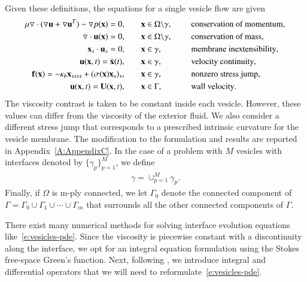 Given these definitions, the equations for a single vesicle flow are
given
\begin{equation}
\label{e:vesicles-pde}
\begin{split}
\mu \grad \cdot (\grad \uu + \grad \uu^{T}) - 
\grad p(\xx) = 0, &\hspace{20pt} \xx \in \Omega\backslash\gamma, \gap
&&\mbox{conservation of momentum},\\
%
 \grad \cdot \uu(\xx) = 0,  &\hspace{20pt} \xx \in \Omega \backslash
 \gamma, \gap &&\mbox{conservation of mass}, \\
%
  \xx_{s} \cdot \uu_{s} = 0, &\hspace{20pt} \xx \in \gamma, \gap
  &&\mbox{membrane inextensibility},\\
%
   \uu(\xx,t) = \dot{\xx}(t), &\hspace{20pt} \xx \in \gamma, \gap   &&\mbox{velocity continuity},\\
\ff(\xx)= -\kappa_{b}\xx_{ssss}
 + (\sigma(\xx) \xx_{s})_{s}, &\hspace{20pt} \xx \in \gamma, \gap  &&\mbox{nonzero stress jump},\\
%
 \uu(\xx,t) = \mathbf{U}(\xx,t), &\hspace{20pt} \xx \in \Gamma, \gap  &&\mbox{wall velocity}. \\
\end{split}
\end{equation}
The viscosity contrast is taken to be constant inside each vesicle.
However, these values can differ from the viscosity of the exterior
fluid.  We also consider a different stress jump that corresponds to a
prescribed intrinsic curvature for the vesicle membrane.  The
modification to the formulation and results are reported in
Appendix~\ref{A:AppendixC}.  In the case of a problem with $M$ vesicles
with interfaces denoted by $\{\gamma_p\}_{p=1}^M$, we define
\begin{align*}
  \gamma = \mathop{\cup}_{p=1}^M \gamma_p.
\end{align*}
Finally, if $\Omega$ is m-ply connected, we let $\Gamma_{0}$ denote the
connected component of $\Gamma = \Gamma_{0} \cup \Gamma_{1} \cup \cdots
\cup \Gamma_{m}$ that surrounds all the other connected components of
$\Gamma$.

There exist many numerical methods for solving interface evolution
equations like~\eqref{e:vesicles-pde}. Since the viscosity is piecewise
constant with a discontinuity along the interface, we opt for an
integral equation formulation using the Stokes free-space Green's
function. Next, following \cite{rah:vee:bir}, we introduce integral and
differential operators that we will need to
reformulate~\eqref{e:vesicles-pde}. 



